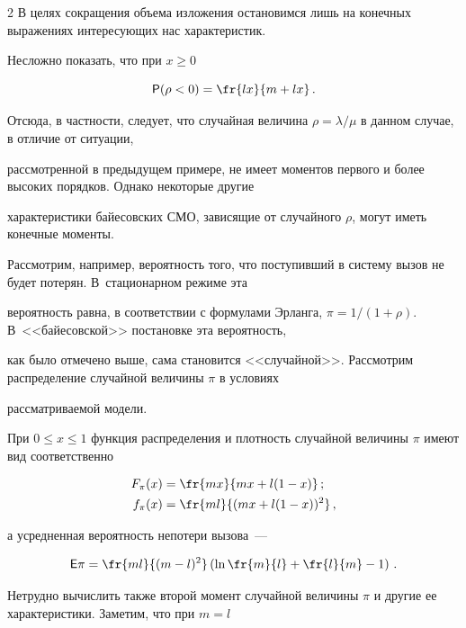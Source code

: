 \begin{multicols}{2}
В целях сокращения объема изложения остановимся лишь на конечных выражениях ин\-те\-ре\-су\-ющих нас характеристик.





Несложно показать, что при $x\ge0$


$$


\p(\rho<0)=\fr{lx}{m+lx}\,.


$$


Отсюда, в частности, следует, что случайная величина $\rho=\lambda/\mu$ в данном случае, в отличие от ситуации,


рассмотренной в предыдущем примере, не имеет моментов первого и более высоких порядков. Однако некоторые другие


характеристики байесовских СМО, зависящие от случайного $\rho$, могут иметь конечные моменты.





Рассмотрим, например, вероятность того, что поступивший в систему вызов не будет потерян. В~стационарном режиме эта


вероятность равна, в соответствии с формулами Эрланга, $\pi=1/(1+\rho)$. В~<<байесовской>> постановке эта вероятность,


как было отмечено выше, сама становится <<случайной>>. Рассмотрим распределение случайной величины $\pi$ в условиях


рассматриваемой модели.





При $0\le x\le1$ функция распределения и плотность случайной величины $\pi$  имеют вид соответственно


\begin{align*}


F_\pi(x)&=\fr{mx}{mx+l(1-x)}\,;\\


f_\pi(x)&=\fr{ml}{(mx+l(1-x))^2}\,,


\end{align*}


а усредненная вероятность непотери вызова~---


$$


\e\pi=\fr{ml}{(m-l)^2}\left(\ln\fr{m}{l}+\fr{l}{m}-1\right)\,.


$$


Нетрудно вычислить также второй момент случайной величины $\pi$ и другие ее характеристики. Заметим, что при $m=l$



\end{multicols}
